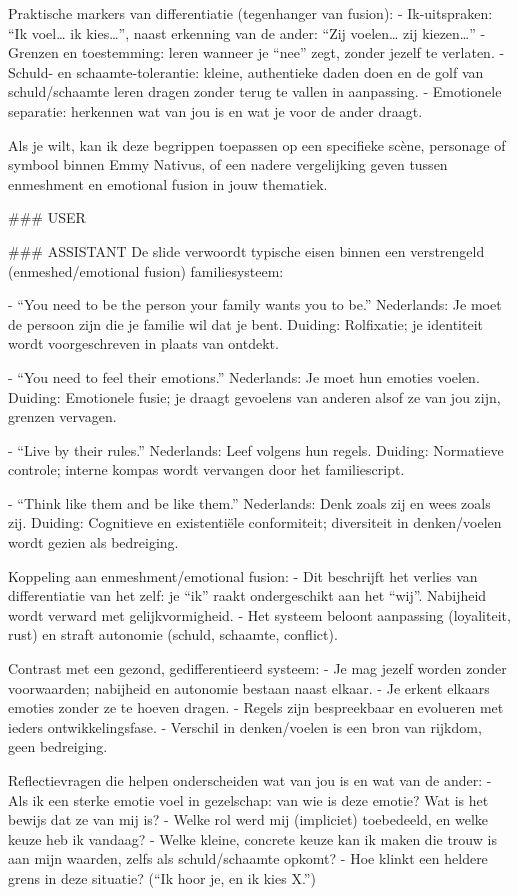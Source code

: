 Praktische markers van differentiatie (tegenhanger van fusion):
- Ik-uitspraken: “Ik voel… ik kies…”, naast erkenning van de ander: “Zij voelen… zij kiezen…”
- Grenzen en toestemming: leren wanneer je “nee” zegt, zonder jezelf te verlaten.
- Schuld- en schaamte-tolerantie: kleine, authentieke daden doen en de golf van schuld/schaamte leren dragen zonder terug te vallen in aanpassing.
- Emotionele separatie: herkennen wat van jou is en wat je voor de ander draagt.

Als je wilt, kan ik deze begrippen toepassen op een specifieke scène, personage of symbool binnen Emmy Nativus, of een nadere vergelijking geven tussen enmeshment en emotional fusion in jouw thematiek.

\#\#\# USER

\#\#\# ASSISTANT
De slide verwoordt typische eisen binnen een verstrengeld (enmeshed/emotional fusion) familiesysteem:

- “You need to be the person your family wants you to be.”
Nederlands: Je moet de persoon zijn die je familie wil dat je bent.
Duiding: Rolfixatie; je identiteit wordt voorgeschreven in plaats van ontdekt.

- “You need to feel their emotions.”
Nederlands: Je moet hun emoties voelen.
Duiding: Emotionele fusie; je draagt gevoelens van anderen alsof ze van jou zijn, grenzen vervagen.

- “Live by their rules.”
Nederlands: Leef volgens hun regels.
Duiding: Normatieve controle; interne kompas wordt vervangen door het familiescript.

- “Think like them and be like them.”
Nederlands: Denk zoals zij en wees zoals zij.
Duiding: Cognitieve en existentiële conformiteit; diversiteit in denken/voelen wordt gezien als bedreiging.

Koppeling aan enmeshment/emotional fusion:
- Dit beschrijft het verlies van differentiatie van het zelf: je “ik” raakt ondergeschikt aan het “wij”. Nabijheid wordt verward met gelijkvormigheid.
- Het systeem beloont aanpassing (loyaliteit, rust) en straft autonomie (schuld, schaamte, conflict).

Contrast met een gezond, gedifferentieerd systeem:
- Je mag jezelf worden zonder voorwaarden; nabijheid en autonomie bestaan naast elkaar.
- Je erkent elkaars emoties zonder ze te hoeven dragen.
- Regels zijn bespreekbaar en evolueren met ieders ontwikkelingsfase.
- Verschil in denken/voelen is een bron van rijkdom, geen bedreiging.

Reflectievragen die helpen onderscheiden wat van jou is en wat van de ander:
- Als ik een sterke emotie voel in gezelschap: van wie is deze emotie? Wat is het bewijs dat ze van mij is?
- Welke rol werd mij (impliciet) toebedeeld, en welke keuze heb ik vandaag?
- Welke kleine, concrete keuze kan ik maken die trouw is aan mijn waarden, zelfs als schuld/schaamte opkomt?
- Hoe klinkt een heldere grens in deze situatie? (“Ik hoor je, en ik kies X.”)

